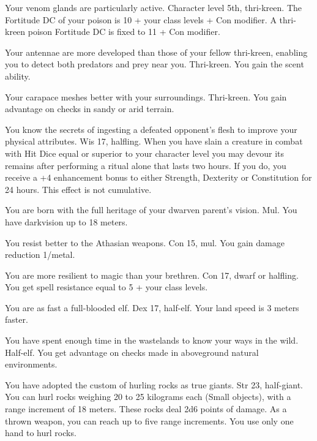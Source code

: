 
{Your venom glands are particularly active.}
{Character level 5th, thri-kreen.}
{The Fortitude DC of your poison is 10 + \onehalf your class levels + Con modifier.}
{A thri-kreen poison Fortitude DC is fixed to 11 + Con modifier.}
{}

{Your antennae are more developed than those of your fellow thri-kreen, enabling you to detect both predators and prey near you.}
{Thri-kreen.}
{You gain the scent ability.}
{}{}

{Your carapace meshes better with your surroundings.}
{Thri-kreen.}
{You gain advantage on  checks in sandy or arid terrain.}
{}{}

{You know the secrets of ingesting a defeated opponent's flesh to improve your physical attributes.}
{Wis 17, halfling.}
{When you have slain a creature in combat with Hit Dice equal or superior to your character level you may devour its remains after performing a ritual alone that lasts two hours. If you do, you receive a +4 enhancement bonus to either Strength, Dexterity or Constitution for 24 hours. This effect is not cumulative.}
{}{}

{You are born with the full heritage of your dwarven parent's vision.}
{Mul.}
{You have darkvision up to 18 meters.}
{}{}

{You resist better to the Athasian weapons.}
{Con 15, mul.}
{You gain damage reduction 1/metal.}
{}{}

{You are more resilient to magic than your brethren.}
{Con 17, dwarf or halfling.}
{You get spell resistance equal to 5 + your class levels.}
{}{}

{You are as fast a full-blooded elf.}
{Dex 17, half-elf.}
{Your land speed is 3 meters faster.}
{}{}

{You have spent enough time in the wastelands to know your ways in the wild.}
{Half-elf.}
{You get advantage on  checks made in aboveground natural environments.}
{}{}

{You have adopted the custom of hurling rocks as true giants.}
{Str 23, half-giant.}
{You can hurl rocks weighing 20 to 25 kilograms each (Small objects), with a range increment of 18 meters. These rocks deal 2d6 points of damage. As a thrown weapon, you can reach up to five range increments. You use only one hand to hurl rocks.}
{}
{}
